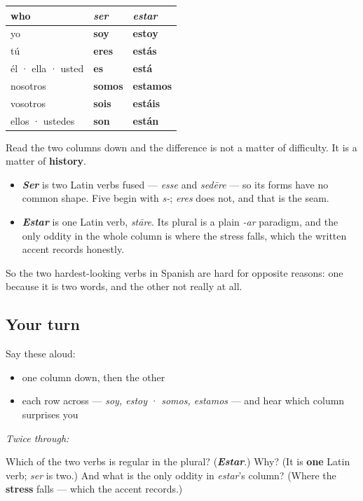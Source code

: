 \begin{grammarlens}[title={Grammar Lens: side by side, and the difference is history}]
\noindent
\begin{tabularx}{\linewidth}{@{}>{\raggedright\arraybackslash}X>{\raggedright\arraybackslash}X>{\raggedright\arraybackslash}X@{}}
\toprule
\textbf{who} & \textbf{\emph{ser}} & \textbf{\emph{estar}} \\
\midrule
yo & \textbf{soy} & \textbf{estoy} \\
tú & \textbf{eres} & \textbf{estás} \\
él · ella · usted & \textbf{es} & \textbf{está} \\
nosotros & \textbf{somos} & \textbf{estamos} \\
vosotros & \textbf{sois} & \textbf{estáis} \\
ellos · ustedes & \textbf{son} & \textbf{están} \\
\bottomrule
\end{tabularx}

Read the two columns down and the difference is not a matter of difficulty. It is a matter of \textbf{history}.

\begin{itemize}
\raggedright
  \item \emph{\textbf{Ser}} is two Latin verbs fused — \emph{esse} and \emph{sedēre} — so its forms have no common shape. Five begin with \emph{s-}; \emph{eres} does not, and that is the seam.
  \item \emph{\textbf{Estar}} is one Latin verb, \emph{stāre}. Its plural is a plain \emph{-ar} paradigm, and the only oddity in the whole column is where the stress falls, which the written accent records honestly.
\end{itemize}

So the two hardest-looking verbs in Spanish are hard for opposite reasons: one because it is two words, and the other not really at all.
\end{grammarlens}

\subsection*{Your turn}
Say these aloud:

\begin{itemize}
\raggedright
  \item one column down, then the other
  \item each row across — \emph{soy, estoy} · \emph{somos, estamos} — and hear which column surprises you
\end{itemize}

\emph{Twice through:}

\begin{tcolorbox}[breakable,colback=teal!4,colframe=teal!35!black,title={Before you move on}]
Which of the two verbs is regular in the plural? (\emph{\textbf{Estar}}.) Why? (It is \textbf{one} Latin verb; \emph{ser} is two.) And what is the only oddity in \emph{estar}'s column? (Where the \textbf{stress} falls — which the accent records.)
\end{tcolorbox}
